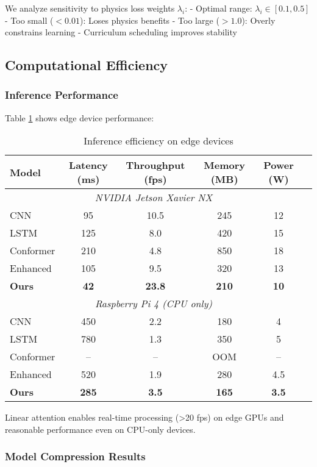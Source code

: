 \documentclass[10pt,journal,compsoc]{IEEEtran}
\begin{document}
We analyze sensitivity to physics loss weights $\lambda_i$:
- Optimal range: $\lambda_i \in [0.1, 0.5]$
- Too small ($<0.01$): Loses physics benefits
- Too large ($>1.0$): Overly constrains learning
- Curriculum scheduling improves stability

\subsection{Computational Efficiency}

\subsubsection{Inference Performance}

Table \ref{tab:efficiency} shows edge device performance:

\begin{table}[h]
\centering
\caption{Inference efficiency on edge devices}
\label{tab:efficiency}
\begin{tabular}{lccccc}
\toprule
Model & Latency (ms) & Throughput (fps) & Memory (MB) & Power (W) \\
\midrule
\multicolumn{5}{c}{\textit{NVIDIA Jetson Xavier NX}} \\
\midrule
CNN & 95 & 10.5 & 245 & 12 \\
LSTM & 125 & 8.0 & 420 & 15 \\
Conformer & 210 & 4.8 & 850 & 18 \\
Enhanced & 105 & 9.5 & 320 & 13 \\
\textbf{Ours} & \textbf{42} & \textbf{23.8} & \textbf{210} & \textbf{10} \\
\midrule
\multicolumn{5}{c}{\textit{Raspberry Pi 4 (CPU only)}} \\
\midrule
CNN & 450 & 2.2 & 180 & 4 \\
LSTM & 780 & 1.3 & 350 & 5 \\
Conformer & -- & -- & OOM & -- \\
Enhanced & 520 & 1.9 & 280 & 4.5 \\
\textbf{Ours} & \textbf{285} & \textbf{3.5} & \textbf{165} & \textbf{3.5} \\
\bottomrule
\end{tabular}
\end{table}

Linear attention enables real-time processing (>20 fps) on edge GPUs and reasonable performance even on CPU-only devices.

\subsubsection{Model Compression Results}
\end{document}

